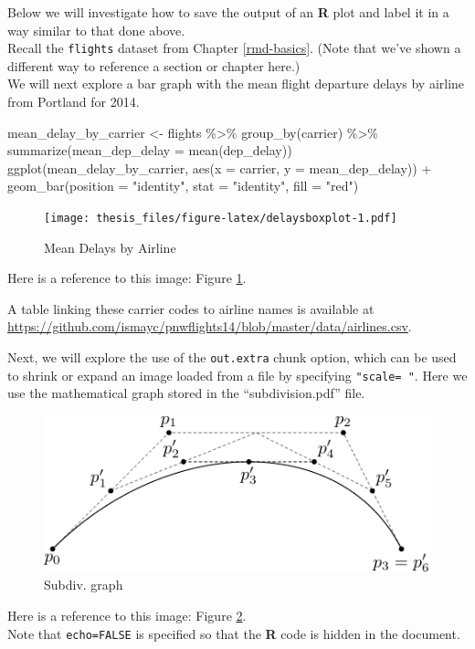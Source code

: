 \documentclass[12pt,oneside]{tisemthesis}
\newenvironment{Shaded}{\begin{snugshade}}{\end{snugshade}}
\newcommand{\AttributeTok}[1]{\textcolor[rgb]{0.77,0.63,0.00}{#1}}
\newcommand{\FunctionTok}[1]{\textcolor[rgb]{0.00,0.00,0.00}{#1}}
\newcommand{\NormalTok}[1]{#1}
\newcommand{\OtherTok}[1]{\textcolor[rgb]{0.56,0.35,0.01}{#1}}
\newcommand{\SpecialCharTok}[1]{\textcolor[rgb]{0.00,0.00,0.00}{#1}}
\newcommand{\StringTok}[1]{\textcolor[rgb]{0.31,0.60,0.02}{#1}}
\begin{document}
\clearpage

Below we will investigate how to save the output of an \textbf{R} plot and label it in a way similar to that done above.\\
Recall the \texttt{flights} dataset from Chapter \ref{rmd-basics}. (Note that we've shown a different way to reference a section or chapter here.)\\
We will next explore a bar graph with the mean flight departure delays by airline from Portland for 2014.
\begin{Shaded}
\begin{Highlighting}[]
\NormalTok{mean\_delay\_by\_carrier }\OtherTok{\textless{}{-}}\NormalTok{ flights }\SpecialCharTok{\%\textgreater{}\%}
  \FunctionTok{group\_by}\NormalTok{(carrier) }\SpecialCharTok{\%\textgreater{}\%}
  \FunctionTok{summarize}\NormalTok{(}\AttributeTok{mean\_dep\_delay =} \FunctionTok{mean}\NormalTok{(dep\_delay))}
\FunctionTok{ggplot}\NormalTok{(mean\_delay\_by\_carrier, }\FunctionTok{aes}\NormalTok{(}\AttributeTok{x =}\NormalTok{ carrier, }\AttributeTok{y =}\NormalTok{ mean\_dep\_delay)) }\SpecialCharTok{+}
  \FunctionTok{geom\_bar}\NormalTok{(}\AttributeTok{position =} \StringTok{"identity"}\NormalTok{, }\AttributeTok{stat =} \StringTok{"identity"}\NormalTok{, }\AttributeTok{fill =} \StringTok{"red"}\NormalTok{)}
\end{Highlighting}
\end{Shaded}
\begin{figure}
\centering
\texttt{[image: thesis\_files/figure-latex/delaysboxplot-1.pdf]}
\caption{\label{fig:delaysboxplot}Mean Delays by Airline}
\end{figure}
Here is a reference to this image: Figure \ref{fig:delaysboxplot}.

A table linking these carrier codes to airline names is available at \url{https://github.com/ismayc/pnwflights14/blob/master/data/airlines.csv}.

\clearpage

Next, we will explore the use of the \texttt{out.extra} chunk option, which can be used to shrink or expand an image loaded from a file by specifying \texttt{"scale=\ "}.
Here we use the mathematical graph stored in the ``subdivision.pdf'' file.
\begin{figure}
\includegraphics[scale=0.75]{figure/subdivision} \caption{Subdiv. graph}\label{fig:subd}
\end{figure}
Here is a reference to this image: Figure \ref{fig:subd}.\\
Note that \texttt{echo=FALSE} is specified so that the \textbf{R} code is hidden in the document.
\end{document}
